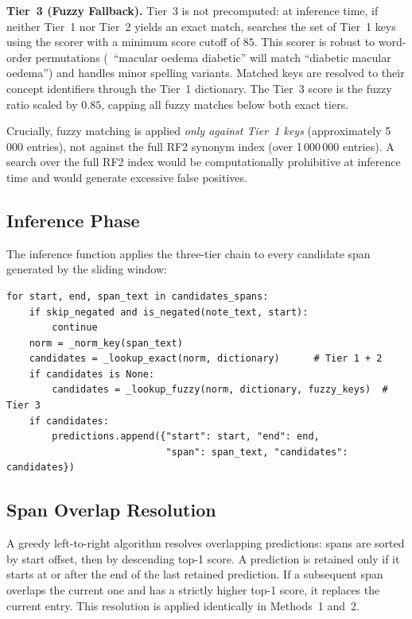 \textbf{Tier~3 (Fuzzy Fallback).} Tier~3 is not precomputed: at inference time, if neither Tier~1 nor Tier~2 yields an exact match,  searches the set of Tier~1 keys using the  scorer with a minimum score cutoff of $85$. This scorer is robust to word-order permutations (\eg\ ``macular oedema diabetic'' will match ``diabetic macular oedema'') and handles minor spelling variants. Matched keys are resolved to their concept identifiers through the Tier~1 dictionary. The Tier~3 score is the fuzzy ratio scaled by $0.85$, capping all fuzzy matches below both exact tiers.

Crucially, fuzzy matching is applied \textit{only against Tier~1 keys} (approximately 5\,000 entries), not against the full RF2 synonym index (over 1\,000\,000 entries). A search over the full RF2 index would be computationally prohibitive at inference time and would generate excessive false positives.

\subsection{Inference Phase}

The inference function applies the three-tier chain to every candidate span generated by the sliding window:

\begin{verbatim}
for start, end, span_text in candidates_spans:
    if skip_negated and is_negated(note_text, start):
        continue
    norm = _norm_key(span_text)
    candidates = _lookup_exact(norm, dictionary)      # Tier 1 + 2
    if candidates is None:
        candidates = _lookup_fuzzy(norm, dictionary, fuzzy_keys)  # Tier 3
    if candidates:
        predictions.append({"start": start, "end": end,
                            "span": span_text, "candidates": candidates})
\end{verbatim}

\subsection{Span Overlap Resolution}

A greedy left-to-right algorithm resolves overlapping predictions: spans are sorted by start offset, then by descending top-1 score. A prediction is retained only if it starts at or after the end of the last retained prediction. If a subsequent span overlaps the current one and has a strictly higher top-1 score, it replaces the current entry. This resolution is applied identically in Methods~1 and~2.

